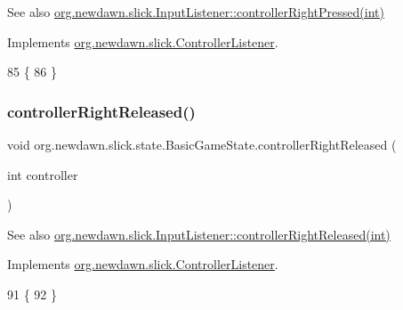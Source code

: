 \begin{DoxySeeAlso}{See also}
\mbox{\hyperlink{interfaceorg_1_1newdawn_1_1slick_1_1_controller_listener_ae4ac64996df9778c4987705275792780}{org.\+newdawn.\+slick.\+Input\+Listener\+::controller\+Right\+Pressed(int)}} 
\end{DoxySeeAlso}


Implements \mbox{\hyperlink{interfaceorg_1_1newdawn_1_1slick_1_1_controller_listener_ae4ac64996df9778c4987705275792780}{org.\+newdawn.\+slick.\+Controller\+Listener}}.


\begin{DoxyCode}
85                                                        \{
86     \}
\end{DoxyCode}
\mbox{\label{classorg_1_1newdawn_1_1slick_1_1state_1_1_basic_game_state_aeec0e8b46063fb631111a0e5f168cd01}} 
\subsubsection{\texorpdfstring{controller\+Right\+Released()}{controllerRightReleased()}}
{\footnotesize\ttfamily void org.\+newdawn.\+slick.\+state.\+Basic\+Game\+State.\+controller\+Right\+Released (\begin{DoxyParamCaption}\item[{int}]{controller }\end{DoxyParamCaption})\hspace{0.3cm}{\ttfamily [inline]}}

\begin{DoxySeeAlso}{See also}
\mbox{\hyperlink{interfaceorg_1_1newdawn_1_1slick_1_1_controller_listener_a33ee418e010e69783169b3f52fb62c3b}{org.\+newdawn.\+slick.\+Input\+Listener\+::controller\+Right\+Released(int)}} 
\end{DoxySeeAlso}


Implements \mbox{\hyperlink{interfaceorg_1_1newdawn_1_1slick_1_1_controller_listener_a33ee418e010e69783169b3f52fb62c3b}{org.\+newdawn.\+slick.\+Controller\+Listener}}.


\begin{DoxyCode}
91                                                         \{
92     \}
\end{DoxyCode}
\mbox{\label{classorg_1_1newdawn_1_1slick_1_1state_1_1_basic_game_state_a14126c2898a6d16c31255e09dbc31df8}} 
